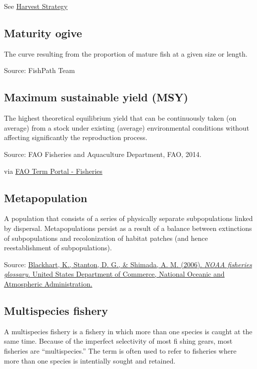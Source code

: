 \documentclass[
  11pt,
]{book}
\begin{document}
See \protect\hyperlink{harvest-strategy}{Harvest Strategy}

\hypertarget{maturity-ogive}{%
\subsection{Maturity ogive}\label{maturity-ogive}}

The curve resulting from the proportion of mature fish at a given size or length.

Source: FishPath Team

\hypertarget{maximum-sustainable-yield-msy}{%
\subsection{Maximum sustainable yield (MSY)}\label{maximum-sustainable-yield-msy}}

The highest theoretical equilibrium yield that can be continuously taken (on average) from a stock under existing (average) environmental conditions without affecting significantly the reproduction process.

Source: FAO Fisheries and Aquaculture Department, FAO, 2014.

via \href{http://www.fao.org/fishery/glossary/en}{FAO Term Portal - Fisheries}

\hypertarget{metapopulation}{%
\subsection{Metapopulation}\label{metapopulation}}

A population that consists of a series of physically separate subpopulations linked by dispersal.
Metapopulations persist as a result of a balance between
extinctions of subpopulations and recolonization
of habitat patches (and hence reestablishment of
subpopulations).

Source: \href{https://repository.library.noaa.gov/view/noaa/12856}{Blackhart, K., Stanton, D. G., \& Shimada, A. M. (2006). \emph{NOAA fisheries glossary.} United States Department of Commerce, National Oceanic and Atmospheric Administration.}

\hypertarget{multispecies-fishery}{%
\subsection{Multispecies fishery}\label{multispecies-fishery}}

A multispecies fishery is a fishery in which more than one species is caught at the same time. Because of the imperfect selectivity of most fi shing gears, most fisheries are ``multispecies.'' The term is often used to refer to fisheries where more than one species is intentially sought and retained.
\end{document}
